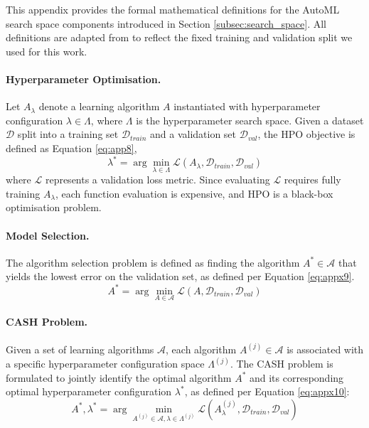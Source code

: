 This appendix provides the formal mathematical definitions for the \ac{AutoML} search space components introduced in Section \ref{subsec:search_space}.
All definitions are adapted from \textcite{AutoMLHoos} to reflect the fixed training and validation split we used for this work.

\paragraph{Hyperparameter Optimisation.}

Let $A_{\lambda}$ denote a learning algorithm $A$ instantiated with hyperparameter configuration $\lambda \in \Lambda$, where $\Lambda$ is the hyperparameter search space.
Given a dataset $\mathcal{D}$ split into a training set $\mathcal{D}_{train}$ and a validation set $\mathcal{D}_{val}$, the \ac{HPO} objective is defined as Equation \ref{eq:app8},
\begin{equation}
    \lambda^* = \arg\min_{\lambda \in \Lambda} \mathcal{L}(A_{\lambda}, \mathcal{D}_{train}, \mathcal{D}_{val})
    \label{eq:app8}
\end{equation}
where $\mathcal{L}$ represents a validation loss metric. Since evaluating $\mathcal{L}$ requires fully training $A_\lambda$, each function evaluation is expensive, and \ac{HPO} is a black-box optimisation problem.

\paragraph{Model Selection.}
The algorithm selection problem is defined as finding the algorithm $A^* \in \mathcal{A}$ that yields the lowest error on the validation set, as defined per Equation \ref{eq:appx9}.
\begin{equation}
    A^* = \arg\min_{A \in \mathcal{A}} \mathcal{L}(A, \mathcal{D}_{train}, \mathcal{D}_{val})
    \label{eq:appx9}
\end{equation}

\paragraph{CASH Problem.}
Given a set of learning algorithms $\mathcal{A}$, each algorithm $A^{(j)} \in \mathcal{A}$ is associated with a specific hyperparameter configuration space $\Lambda^{(j)}$.
The \ac{CASH} problem is formulated to jointly identify the optimal algorithm $A^*$ and its corresponding optimal hyperparameter configuration $\lambda^*$, as defined per Equation \ref{eq:appx10}:
\begin{equation}
    A^*, \lambda^* = \arg\min_{A^{(j)} \in \mathcal{A}, \lambda \in \Lambda^{(j)}} \mathcal{L}(A^{(j)}_{\lambda}, \mathcal{D}_{train}, \mathcal{D}_{val})
    \label{eq:appx10}
\end{equation}





